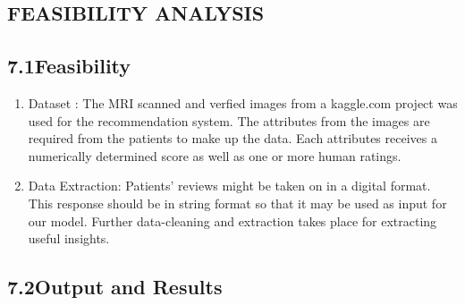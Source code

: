 \documentclass[oneside,a4paper,12pt]{book}
\begin{document}
\vspace{\baselineskip}
\begin{appendices}
\setlength{\parskip}{15.0pt}
\chapter{FEASIBILITY ANALYSIS}\par

\setlength{\parskip}{9.96pt}
\section*{7.1\hspace*{10pt}Feasibility}
\begin{enumerate}
    \item Dataset :
    The MRI scanned and verfied images from a kaggle.com project  was used for the recommendation system. The  attributes from the images  are required from the patients to make up the data. Each attributes receives a numerically determined score as well as one or more human ratings.
    \item Data Extraction:
    Patients' reviews might be taken on in a digital format. This response should be in string format so that it may be used as input for our model. Further data-cleaning and extraction takes place for extracting useful insights.
  
\end{enumerate}
\newpage
\section*{7.2\hspace*{10pt}Output and Results}


\end{appendices}
\end{document}
